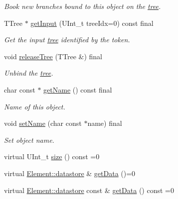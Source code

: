 \begin{DoxyCompactItemize}
\begin{DoxyCompactList}\small\item\em Book new branches bound to this object on the \hyperlink{namespacepanda_1_1tree}{tree}. \item\end{DoxyCompactList}\item 
TTree $\ast$ \hyperlink{classpanda_1_1ContainerBase_aee836fc160acb4244a2dab856e9bb97a}{getInput} (UInt\_\-t treeIdx=0) const final
\begin{DoxyCompactList}\small\item\em Get the input \hyperlink{namespacepanda_1_1tree}{tree} identified by the token. \item\end{DoxyCompactList}\item 
void \hyperlink{classpanda_1_1ContainerBase_a5e646fde2bfb6e9650d2e3db5c80a349}{releaseTree} (TTree \&) final
\begin{DoxyCompactList}\small\item\em Unbind the \hyperlink{namespacepanda_1_1tree}{tree}. \item\end{DoxyCompactList}\item 
char const $\ast$ \hyperlink{classpanda_1_1ContainerBase_a1d34d04ba62ea436b805c73f3e5a7e04}{getName} () const final
\begin{DoxyCompactList}\small\item\em Name of this object. \item\end{DoxyCompactList}\item 
void \hyperlink{classpanda_1_1ContainerBase_a43e10c3e6286b03ba6906f843318d88a}{setName} (char const $\ast$name) final
\begin{DoxyCompactList}\small\item\em Set object name. \item\end{DoxyCompactList}\item 
virtual UInt\_\-t \hyperlink{classpanda_1_1ContainerBase_a4035294b020325b57cafa39fb459fd7a}{size} () const =0
\item 
virtual \hyperlink{structpanda_1_1Element_1_1datastore}{Element::datastore} \& \hyperlink{classpanda_1_1ContainerBase_adbb8e159edc835222dc6485291d3830d}{getData} ()=0
\item 
virtual \hyperlink{structpanda_1_1Element_1_1datastore}{Element::datastore} const \& \hyperlink{classpanda_1_1ContainerBase_aaf39afa04dcee863becce6b68068f809}{getData} () const =0

\end{DoxyCompactItemize}

